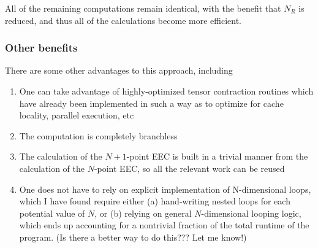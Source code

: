 \documentclass{article}
\begin{document}
All of the remaining computations remain identical, with the benefit that $N_R$ is reduced, and thus all of the calculations become more efficient.

\subsubsection{Other benefits}

There are some other advantages to this approach, including
\begin{enumerate}
    \item One can take advantage of highly-optimized tensor contraction routines which have already been implemented in such a way as to optimize for cache locality, parallel execution, etc
    \item The computation is completely branchless
    \item The calculation of the $N+1$-point EEC is built in a trivial manner from the calculation of the $N$-point EEC, so all the relevant work can be reused
    \item One does not have to rely on explicit implementation of N-dimensional loops, which I have found require either (a) hand-writing nested loops for each potential value of $N$, or (b) relying on general $N$-dimensional looping logic, which ends up accounting for a nontrivial fraction of the total runtime of the program. (Is there a better way to do this??? Let me know!)
\end{enumerate}
    
\end{document}
